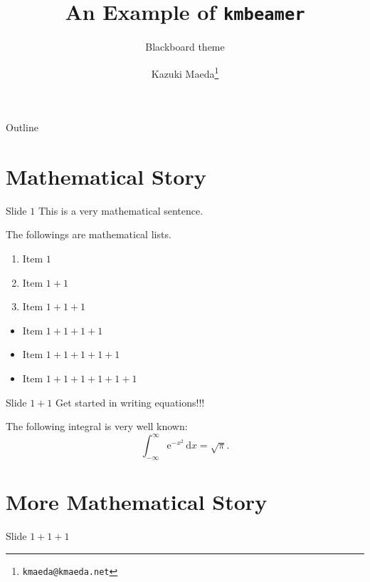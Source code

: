 \documentclass[aspectratio=43]{beamer}
\title{An Example of \texttt{kmbeamer}}
\subtitle{Blackboard theme}
\author{Kazuki Maeda\footnote{\texttt{kmaeda@kmaeda.net}}}
\begin{document}
\begin{frame}
  \maketitle
\end{frame}

\begin{frame}{Outline}
  \tableofcontents
\end{frame}

\section{Mathematical Story}

\begin{frame}{Slide $1$}
  This is a very mathematical sentence.

  \pause

  The followings are mathematical lists.

  \begin{enumerate}
  \item Item $1$\pause
  \item Item $1+1$\pause
  \item Item $1+1+1$
  \end{enumerate}

  \pause

  \begin{itemize}
  \item Item $1+1+1+1$\pause
  \item Item $1+1+1+1+1$\pause
  \item Item $1+1+1+1+1+1$
  \end{itemize}
\end{frame}

\begin{frame}{Slide $1+1$}
  \alert{Get started in writing equations!!!}

  \begin{theorem}
    The following integral is very well known:
    \begin{equation}
      \int_{-\infty}^\infty \mathrm{e}^{-x^2}\,\mathrm{d}x=\sqrt{\pi}.
    \end{equation}

  \end{theorem}
\end{frame}

\section{More Mathematical Story}
\begin{frame}{Slide $1+1+1$}
  \lipsum[1]
\end{frame}
\end{document}
